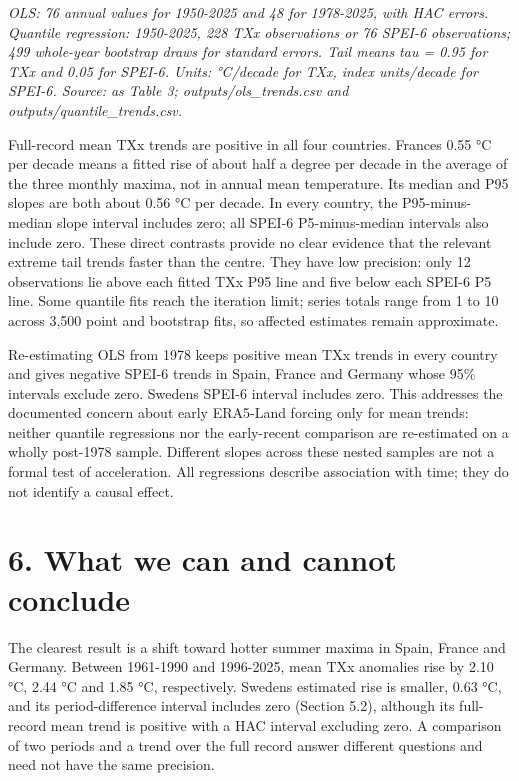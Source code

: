 \documentclass[
  10pt,
]{article}
\begin{document}
\emph{OLS: 76 annual values for 1950-2025 and 48 for 1978-2025, with HAC
errors. Quantile regression: 1950-2025, 228 TXx observations or 76
SPEI-6 observations; 499 whole-year bootstrap draws for standard errors.
Tail means tau = 0.95 for TXx and 0.05 for SPEI-6. Units: °C/decade for
TXx, index units/decade for SPEI-6. Source: as Table 3;
outputs/ols\_trends.csv and outputs/quantile\_trends.csv.}

Full-record mean TXx trends are positive in all four countries.
France\textquotesingle s 0.55 °C per decade means a fitted rise of about
half a degree per decade in the average of the three monthly maxima, not
in annual mean temperature. Its median and P95 slopes are both about
0.56 °C per decade. In every country, the P95-minus-median slope
interval includes zero; all SPEI-6 P5-minus-median intervals also
include zero. These direct contrasts provide no clear evidence that the
relevant extreme tail trends faster than the centre. They have low
precision: only 12 observations lie above each fitted TXx P95 line and
five below each SPEI-6 P5 line. Some quantile fits reach the iteration
limit; series totals range from 1 to 10 across 3,500 point and bootstrap
fits, so affected estimates remain approximate.

Re-estimating OLS from 1978 keeps positive mean TXx trends in every
country and gives negative SPEI-6 trends in Spain, France and Germany
whose 95\% intervals exclude zero. Sweden\textquotesingle s SPEI-6
interval includes zero. This addresses the documented concern about
early ERA5-Land forcing only for mean trends: neither quantile
regressions nor the early-recent comparison are re-estimated on a wholly
post-1978 sample. Different slopes across these nested samples are not a
formal test of acceleration. All regressions describe association with
time; they do not identify a causal effect.

\section{6. What we can and cannot
conclude}\label{what-we-can-and-cannot-conclude}

The clearest result is a shift toward hotter summer maxima in Spain,
France and Germany. Between 1961-1990 and 1996-2025, mean TXx anomalies
rise by 2.10 °C, 2.44 °C and 1.85 °C, respectively.
Sweden\textquotesingle s estimated rise is smaller, 0.63 °C, and its
period-difference interval includes zero (Section 5.2), although its
full-record mean trend is positive with a HAC interval excluding zero. A
comparison of two periods and a trend over the full record answer
different questions and need not have the same precision.
\end{document}
